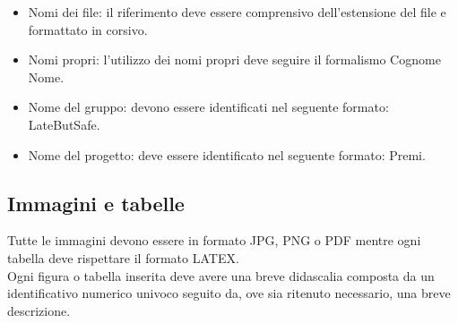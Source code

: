 {{\begin{itemize}
				\item Nomi dei file: il riferimento deve essere comprensivo dell’estensione del file e formattato in corsivo.
				\item Nomi propri: l’utilizzo dei nomi propri deve seguire il formalismo Cognome Nome.
				\item Nome del gruppo: devono essere identificati nel seguente formato: LateButSafe.
				\item Nome del progetto: deve essere identificato nel seguente formato: Premi.
			\end{itemize}
			}
		\subsection{Immagini e tabelle}{
			\label{sub:img}
			Tutte le immagini devono essere in formato JPG, PNG o PDF mentre ogni tabella deve rispettare il formato LATEX.\\
			Ogni figura o tabella inserita deve avere una breve didascalia composta da un identificativo numerico univoco seguito da, ove sia ritenuto necessario, una breve descrizione.
			}

		}